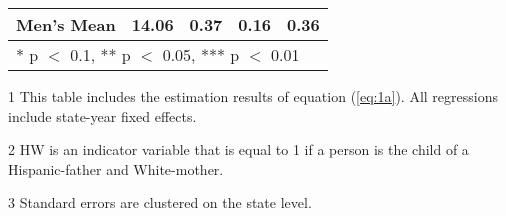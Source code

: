 \begin{table}[H]
\begin{threeparttable}
\begin{tabular}[t]{lcccc}
Men's Mean & 14.06 & 0.37 & 0.16 & 0.36\\
\bottomrule
\multicolumn{5}{l}{\rule{0pt}{1em}* p $<$ 0.1, ** p $<$ 0.05, *** p $<$ 0.01}\\
\end{tabular}
\begin{tablenotes}
\item[1] {\footnotesize{This table includes the estimation results of equation (\ref{eq:1a}). All regressions include state-year fixed effects.}}
\item[2] {\footnotesize{HW is an indicator variable that is equal to 1 if a person is the child of a Hispanic-father and White-mother.}}
\item[3] {\footnotesize{Standard errors are clustered on the state level.}}
\end{tablenotes}
\end{threeparttable}
\end{table}

